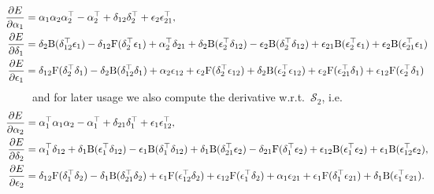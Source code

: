 \documentclass[12pt,a4paper]{article}
\newcommand{\Sop}{\mathcal{S}}
\begin{document}
\begin{equation*}
\hspace{-1cm}
\begin{aligned}
\frac{\partial E}{\partial \alpha_1} &= \alpha_1 \alpha_2 \alpha_2^\top - \alpha_2^\top + \delta_{12} \delta_2^\top + \epsilon_2 \epsilon_{21}^\top, \\
\frac{\partial E}{\partial \delta_1} &= 
\delta_2 \mathrm{B}(\delta_{12}^\top \epsilon_1) - \delta_{12} \mathrm{F}(\delta_2^\top \epsilon_1) 
+ \alpha_2^\top \delta_{21} + \delta_2 \mathrm{B}(\epsilon_2^\top \delta_{12}) - \epsilon_2 \mathrm{B}(\delta_2^\top \delta_{12}) 
+ \epsilon_{21} \mathrm{B}(\epsilon_2^\top \epsilon_1) + \epsilon_2 \mathrm{B}(\epsilon_{21}^\top \epsilon_1)
\\
\frac{\partial E}{\partial \epsilon_1} &=
\delta_{12} \mathrm{F}(\delta_2^\top \delta_1) - \delta_2 \mathrm{B}(\delta_{12}^\top \delta_1)
+ \alpha_2 \epsilon_{12} + \epsilon_2 \mathrm{F}(\delta_2^\top \epsilon_{12}) + \delta_2 \mathrm{B}(\epsilon_2^\top \epsilon_{12})
+ \epsilon_2 \mathrm{F}(\epsilon_{21}^\top \delta_1) + \epsilon_{12} \mathrm{F}(\epsilon_2^\top \delta_1)
\end{aligned}
\end{equation*}
and for later usage we also compute the derivative w.r.t.\ $\Sop_2$, i.e.\
\begin{equation*}
\hspace{-1cm}
\begin{aligned}
\frac{\partial E}{\partial \alpha_2} &= \alpha_1^\top \alpha_1 \alpha_2 - \alpha_1^\top + \delta_{21} \delta_1^\top + \epsilon_1 \epsilon_{12}^\top, \\
\frac{\partial E}{\partial \delta_2} &=
\alpha_1^\top \delta_{12} + \delta_1 \mathrm{B}(\epsilon_1^\top \delta_{12}) - \epsilon_1 \mathrm{B}(\delta_1^\top \delta_{12})
+ \delta_1 \mathrm{B}(\delta_{21}^\top \epsilon_2) - \delta_{21} \mathrm{F}(\delta_1^\top \epsilon_2) 
+ \epsilon_{12} \mathrm{B}(\epsilon_1^\top \epsilon_2) + \epsilon_1 \mathrm{B}(\epsilon_{12}^\top \epsilon_2), \\
\frac{\partial E}{\partial \epsilon_2} &=
\delta_{12} \mathrm{F}(\delta_1^\top \delta_2) - \delta_1 \mathrm{B}(\delta_{21}^\top \delta_2)
+ \epsilon_1 \mathrm{F}(\epsilon_{12}^\top \delta_2) + \epsilon_{12} \mathrm{F}(\epsilon_1^\top \delta_2)
+ \alpha_1 \epsilon_{21} + \epsilon_1 \mathrm{F}(\delta_1^\top \epsilon_{21}) + \delta_1 \mathrm{B}(\epsilon_1^\top \epsilon_{21}).
\end{aligned}
\end{equation*}
\end{document}
